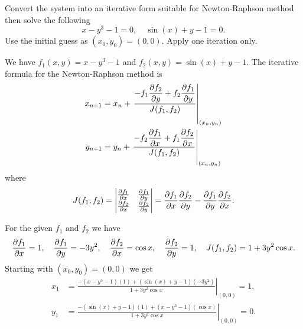\documentclass[11pt]{penrose}
\begin{document}
\begin{problem}{6}
    Convert the system into an iterative form suitable for Newton-Raphson method then solve the following
    \begin{equation*}
        x - y^3 - 1 = 0,
        \quad
        \sin(x) + y - 1 = 0.
    \end{equation*}
    Use the initial guess as $(x_0, y_0) = (0,0)$. Apply one iteration only.

    \solution We have $f_1 (x,y) = x - y^3 - 1$ and $f_2 (x,y) = \sin(x) + y - 1$. The iterative formula for the Newton-Raphson method is
    \begin{align*}
        x_{n+1} &= x_{n} + \left.\frac{\displaystyle -f_1 \frac{\partial f_2}{\partial y} + f_2 \frac{\partial f_1}{\partial y}}{J( f_1, f_2 )}\right|_{(x_n, y_n)}\\
        y_{n+1} &= y_{n} + \left.\frac{\displaystyle -f_2 \frac{\partial f_1}{\partial x} + f_1 \frac{\partial f_2}{\partial x}}{J( f_1, f_2 )}\right|_{(x_n, y_n)}
    \end{align*}
    where
    \begin{equation}
        J(f_1, f_2)
        = \begin{vmatrix}
        \frac{\partial f_1}{\partial x} & \frac{\partial f_1}{\partial y}\\
        \frac{\partial f_2}{\partial x} & \frac{\partial f_2}{\partial y}
        \end{vmatrix}
        = \frac{\partial f_1}{\partial x} \frac{\partial f_2}{\partial y} - \frac{\partial f_1}{\partial y} \frac{\partial f_2}{\partial x}.
    \end{equation}

    For the given $f_1$ and $f_2$ we have
    \begin{equation}
        \frac{\partial f_1}{\partial x} = 1, \quad
        \frac{\partial f_1}{\partial y} = -3y^2, \quad
        \frac{\partial f_2}{\partial x} = \cos x, \quad
        \frac{\partial f_2}{\partial y} = 1, \quad
        J(f_1, f_2) = 1 + 3y^2 \cos x.
    \end{equation}
    Starting with $(x_0, y_0) = (0,0)$ we get
    \begin{align*}
        x_{1} &= \left.\frac{\displaystyle -(x - y^3 - 1)(1) + (\sin(x) + y - 1)(-3y^2)}{1 + 3y^2 \cos x}\right|_{(0,0)} = 1,\\
        y_{1} &= \left.\frac{\displaystyle -(\sin(x) + y - 1)(1) + (x - y^3 - 1)(\cos x)}{1 + 3y^2 \cos x}\right|_{(0,0)} = 0.
    \end{align*}
\end{problem}
\end{document}
